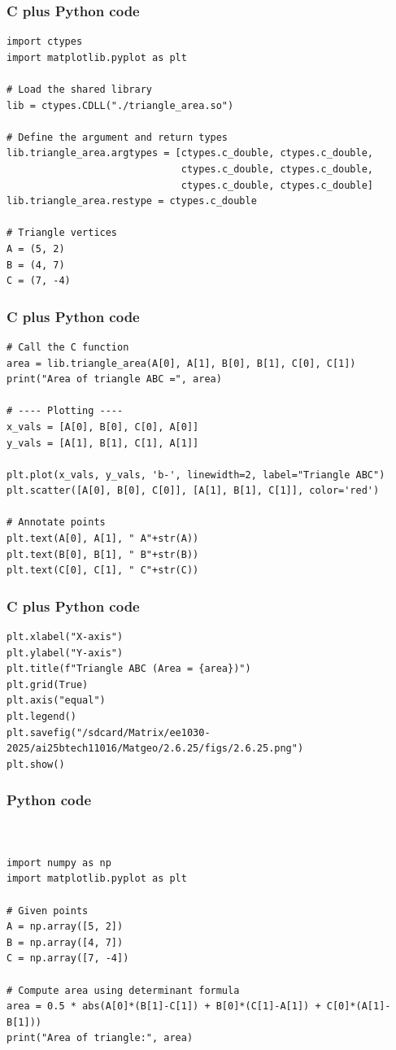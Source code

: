 \documentclass{beamer}
\begin{document}
\begin{frame}[fragile]
    \frametitle{C plus Python code}
    \begin{lstlisting}
import ctypes
import matplotlib.pyplot as plt

# Load the shared library
lib = ctypes.CDLL("./triangle_area.so")

# Define the argument and return types
lib.triangle_area.argtypes = [ctypes.c_double, ctypes.c_double,
                              ctypes.c_double, ctypes.c_double,
                              ctypes.c_double, ctypes.c_double]
lib.triangle_area.restype = ctypes.c_double

# Triangle vertices
A = (5, 2)
B = (4, 7)
C = (7, -4)
\end{lstlisting}
\end{frame}
\begin{frame}[fragile]
    \frametitle{C plus Python code}
    \begin{lstlisting}
# Call the C function
area = lib.triangle_area(A[0], A[1], B[0], B[1], C[0], C[1])
print("Area of triangle ABC =", area)

# ---- Plotting ----
x_vals = [A[0], B[0], C[0], A[0]]
y_vals = [A[1], B[1], C[1], A[1]]

plt.plot(x_vals, y_vals, 'b-', linewidth=2, label="Triangle ABC")
plt.scatter([A[0], B[0], C[0]], [A[1], B[1], C[1]], color='red')

# Annotate points
plt.text(A[0], A[1], " A"+str(A))
plt.text(B[0], B[1], " B"+str(B))
plt.text(C[0], C[1], " C"+str(C))
\end{lstlisting}
\end{frame}
\begin{frame}[fragile]
    \frametitle{C plus Python code}
    \begin{lstlisting}
plt.xlabel("X-axis")
plt.ylabel("Y-axis")
plt.title(f"Triangle ABC (Area = {area})")
plt.grid(True)
plt.axis("equal")
plt.legend()
plt.savefig("/sdcard/Matrix/ee1030-2025/ai25btech11016/Matgeo/2.6.25/figs/2.6.25.png")
plt.show()
\end{lstlisting}
\end{frame}
\begin{frame}[fragile]
    \frametitle{Python code}
    \begin{lstlisting}


import numpy as np
import matplotlib.pyplot as plt

# Given points
A = np.array([5, 2])
B = np.array([4, 7])
C = np.array([7, -4])

# Compute area using determinant formula
area = 0.5 * abs(A[0]*(B[1]-C[1]) + B[0]*(C[1]-A[1]) + C[0]*(A[1]-B[1]))
print("Area of triangle:", area)
\end{lstlisting}
\end{frame}
\end{document}
